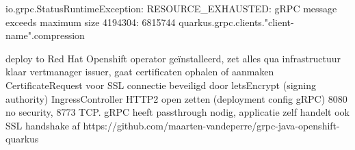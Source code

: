 io.grpc.StatusRuntimeException: RESOURCE_EXHAUSTED: gRPC message exceeds maximum size 4194304: 6815744
quarkus.grpc.clients."client-name".compression


deploy to Red Hat Openshift
operator geïnstalleerd, zet alles qua infrastructuur klaar
vertmanager issuer, gaat certificaten ophalen of aanmaken
CertificateRequest voor SSL connectie beveiligd door letsEncrypt (signing authority)
IngressController HTTP2 open zetten (deployment config gRPC) 8080 no security, 8773 TCP. gRPC heeft passthrough nodig, applicatie zelf handelt ook SSL handshake af
https://github.com/maarten-vandeperre/grpc-java-openshift-quarkus



